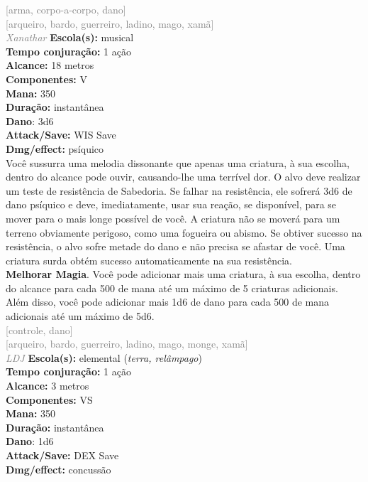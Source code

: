 \documentclass{RPG_Adventure}[2021/10/20]
\begin{document}
{\scriptsize \textcolor{gray}{[arma, corpo-a-corpo, dano]\\}}
{\scriptsize \textcolor{gray}{[arqueiro, bardo, guerreiro, ladino, mago, xamã]\\}}
{\tiny \textcolor{gray}{\textit{Xanathar}}}\jump{}
{\small \t \textbf{Escola(s):} musical\\\t \textbf{Tempo conjuração:} 1 ação\\\t \textbf{Alcance:} 18 metros\\\t \textbf{Componentes:} V\\\t \textbf{Mana:} 350\\\t \textbf{Duração:} instantânea\\\t \textbf{Dano}: 3d6\\\t \textbf{Attack/Save:} WIS Save\\\t \textbf{Dmg/effect:} psíquico\\}
{\normalsize Você sussurra uma melodia dissonante que apenas uma criatura, à sua escolha, dentro do alcance pode ouvir, causando-lhe uma terrível dor. O alvo deve realizar um teste de resistência de Sabedoria. Se falhar na resistência, ele sofrerá 3d6 de dano psíquico e deve, imediatamente, usar sua reação, se disponível, para se mover para o mais longe possível de você. A criatura não se moverá para um terreno obviamente perigoso, como uma fogueira ou abismo. Se obtiver sucesso na resistência, o alvo sofre metade do dano e não precisa se afastar de você. Uma criatura surda obtém sucesso automaticamente na sua resistência.\\\t \textbf{Melhorar Magia}. Você pode adicionar mais uma criatura, à sua escolha, dentro do alcance para cada 500 de mana até um máximo de 5 criaturas adicionais. Além disso, você pode adicionar mais 1d6 de dano para cada 500 de mana adicionais até um máximo de 5d6.\\}
{\scriptsize \textcolor{gray}{[controle, dano]\\}}
{\scriptsize \textcolor{gray}{[arqueiro, bardo, guerreiro, ladino, mago, monge, xamã]\\}}
{\tiny \textcolor{gray}{\textit{LDJ}}}\jump{}
{\small \t \textbf{Escola(s):} elemental (\textit{terra, relâmpago})\\\t \textbf{Tempo conjuração:} 1 ação\\\t \textbf{Alcance:} 3 metros\\\t \textbf{Componentes:} VS\\\t \textbf{Mana:} 350\\\t \textbf{Duração:} instantânea\\\t \textbf{Dano}: 1d6\\\t \textbf{Attack/Save:} DEX Save\\\t \textbf{Dmg/effect:} concussão\\}
\end{document}
